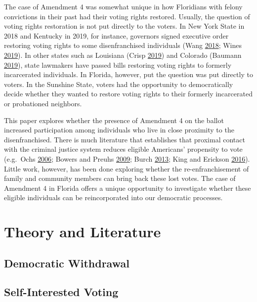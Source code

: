 \documentclass[
  12pt,
]{article}
\begin{document}
The case of Amendment 4 was somewhat unique in how Floridians with felony convictions in their past had their voting rights restored. Usually, the question of voting rights restoration is not put directly to the voters. In New York State in 2018 and Kentucky in 2019, for instance, governors signed executive order restoring voting rights to some disenfranchised individuals (Wang \protect\hyperlink{ref-Wang2018}{2018}; Wines \protect\hyperlink{ref-Wines2019}{2019}). In other states such as Louisiana (Crisp \protect\hyperlink{ref-Crisp2019}{2019}) and Colorado (Baumann \protect\hyperlink{ref-Baumann2019}{2019}), state lawmakers have passed bills restoring voting rights to formerly incarcerated individuals. In Florida, however, put the question was put directly to voters. In the Sunshine State, voters had the opportunity to democratically decide whether they wanted to restore voting rights to their formerly incarcerated or probationed neighbors.

This paper explores whether the presence of Amendment 4 on the ballot increased participation among individuals who live in close proximity to the disenfranchised. There is much literature that establishes that proximal contact with the criminal justice system reduces eligible Americans' propensity to vote (e.g.~Ochs \protect\hyperlink{ref-Ochs2006}{2006}; Bowers and Preuhs \protect\hyperlink{ref-Bowers2009}{2009}; Burch \protect\hyperlink{ref-Burch2013}{2013}; King and Erickson \protect\hyperlink{ref-King2016}{2016}). Little work, however, has been done exploring whether the re-enfranchisement of family and community members can bring back these lost votes. The case of Amendment 4 in Florida offers a unique opportunity to investigate whether these eligible individuals can be reincorporated into our democratic processes.

\hypertarget{theory-and-literature}{%
\section*{Theory and Literature}\label{theory-and-literature}}

\hypertarget{democratic-withdrawal}{%
\subsection*{Democratic Withdrawal}\label{democratic-withdrawal}}

\hypertarget{self-interested-voting}{%
\subsection*{Self-Interested Voting}\label{self-interested-voting}}
\end{document}
